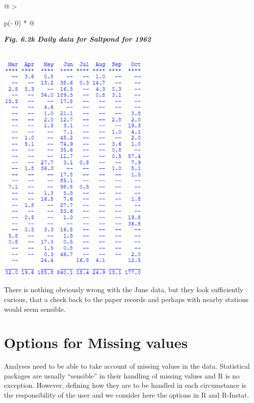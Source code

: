 \documentclass[
  letterpaper,
  DIV=11,
  numbers=noendperiod]{scrreprt}
\begin{document}
\begin{longtable}[]{@{}
  >{\raggedright\arraybackslash}p{(\columnwidth - 0\tabcolsep) * }@{}}
\toprule\noalign{}
\begin{minipage}[b]{\linewidth}\raggedright
\textbf{\emph{Fig. 6.2k Daily data for Saltpond for 1962}}
\end{minipage} \\
\midrule\noalign{}
\endhead
\bottomrule\noalign{}
\endlastfoot
\includegraphics[width=2.94077in,height=4.57665in]{figures/Fig6.4k.png} \\
\end{longtable}

There is nothing obviously wrong with the June data, but they look
sufficiently curious, that a check back to the paper records and perhaps
with nearby stations would seem sensible.

\section{Options for Missing values}\label{options-for-missing-values}

Analyses need to be able to take account of missing values in the data.
Statistical packages are usually ``sensible'' in their handling of
missing values and R is no exception. However, defining how they are to
be handled in each circumstance is the responsibility of the user and we
consider here the options in R and R-Instat.
\end{document}
